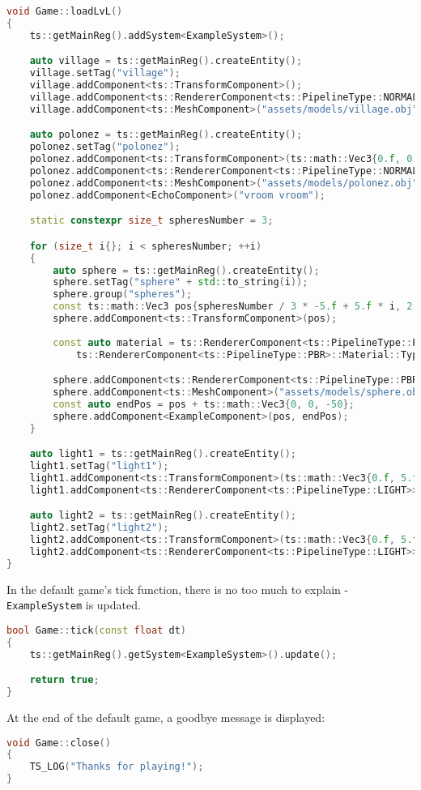 \begin{lstlisting}[language=c++, caption=Example of Game Load Level function (./game/game.cpp)]
void Game::loadLvL()
{
    ts::getMainReg().addSystem<ExampleSystem>();

    auto village = ts::getMainReg().createEntity();
    village.setTag("village");
    village.addComponent<ts::TransformComponent>();
    village.addComponent<ts::RendererComponent<ts::PipelineType::NORMAL_LIGHTING>>();
    village.addComponent<ts::MeshComponent>("assets/models/village.obj");

    auto polonez = ts::getMainReg().createEntity();
    polonez.setTag("polonez");
    polonez.addComponent<ts::TransformComponent>(ts::math::Vec3{0.f, 0.f, -10.f});
    polonez.addComponent<ts::RendererComponent<ts::PipelineType::NORMAL_LIGHTING>>();
    polonez.addComponent<ts::MeshComponent>("assets/models/polonez.obj");
    polonez.addComponent<EchoComponent>("vroom vroom");

    static constexpr size_t spheresNumber = 3;

    for (size_t i{}; i < spheresNumber; ++i)
    {
        auto sphere = ts::getMainReg().createEntity();
        sphere.setTag("sphere" + std::to_string(i));
        sphere.group("spheres");
        const ts::math::Vec3 pos{spheresNumber / 3 * -5.f + 5.f * i, 2.f, -5.f};
        sphere.addComponent<ts::TransformComponent>(pos);
     
        const auto material = ts::RendererComponent<ts::PipelineType::PBR>::Material::create(
            ts::RendererComponent<ts::PipelineType::PBR>::Material::Type::GOLD);

        sphere.addComponent<ts::RendererComponent<ts::PipelineType::PBR>>(material);
        sphere.addComponent<ts::MeshComponent>("assets/models/sphere.obj");
        const auto endPos = pos + ts::math::Vec3{0, 0, -50};
        sphere.addComponent<ExampleComponent>(pos, endPos);
    }

    auto light1 = ts::getMainReg().createEntity();
    light1.setTag("light1");
    light1.addComponent<ts::TransformComponent>(ts::math::Vec3{0.f, 5.f, -7.f});
    light1.addComponent<ts::RendererComponent<ts::PipelineType::LIGHT>>();

    auto light2 = ts::getMainReg().createEntity();
    light2.setTag("light2");
    light2.addComponent<ts::TransformComponent>(ts::math::Vec3{0.f, 5.f,  0.f});
    light2.addComponent<ts::RendererComponent<ts::PipelineType::LIGHT>>();
}
\end{lstlisting}
In the default game's tick function, there is no too much to explain - \texttt{ExampleSystem} is updated.
\begin{lstlisting}[language=c++, caption=Example of Game Tick Function (./game/game.cpp)]
bool Game::tick(const float dt)
{
    ts::getMainReg().getSystem<ExampleSystem>().update();

    return true;
}
\end{lstlisting}
At the end of the default game, a goodbye message is displayed:
\begin{lstlisting}[language=c++, caption=Example of Game Close Function (./game/game.cpp)]
void Game::close()
{
    TS_LOG("Thanks for playing!");
}
\end{lstlisting}